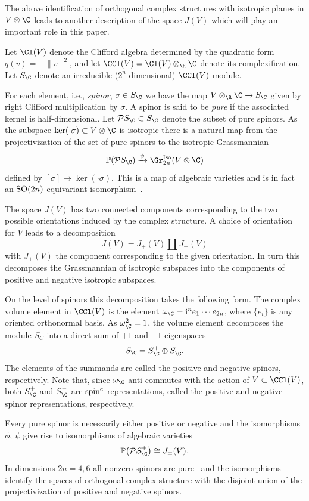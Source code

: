 The above identification of orthogonal complex structures with isotropic planes in
$V\otimes \C$ leads to another description of the space $J(V)$ which will play an
important role in this paper.


Let $\Cl(V)$ denote the Clifford algebra determined by the quadratic form $q(v)=-\|v\|^2$, and let $\CCl(V)=\Cl(V)\otimes_\R \C$
denote its complexification. Let $S_{\C}$ denote an irreducible ($2^n$-dimensional) $\CCl(V)$-module.

For each element, i.e., \emph{spinor}, $\sigma \in S_{\C}$ we have the map $V\otimes_\R \C \to S_{\C}$ given by right Clifford multiplication by $\sigma$. A spinor is said to be \emph{pure} if the associated kernel is half-dimensional. Let ${\mathcal P}S _{\C} \subset S_\C$ denote the subset of pure spinors. As the subspace $\ker (\cdot \sigma) \subset V\otimes \C$ is isotropic
there is a natural map from the projectivization of the set of pure spinors to the isotropic Grassmannian
\[
\mathbb{P}( {\mathcal P}S _\C ) \xrightarrow{\psi} \Gr^{\rm Iso}_{2n}(V\otimes \C)
\]
defined by $[\sigma] \mapsto \ker (\cdot \sigma)$. This is a map of algebraic varieties and is in fact an ${\rm SO}(2n)$-equivariant isomorphism~\cite[Proposition~IV.9.7]{LM}.

The space $J(V)$ has two connected components corresponding to the two possible orientations induced by the complex structure. A choice of orientation for $V$ leads to a decomposition
\[J(V) = J_+(V) \coprod J_-(V)\]
with $J_+(V)$ the component corresponding to the given orientation. In turn this decomposes the Grassmannian of isotropic subspaces into the components of positive and negative isotropic subspaces.

On the level of spinors this decomposition takes the following form.
The complex volume element in $\CCl(V)$ is the element
$\omega_\C = {\rm i}^n e_1 \cdots e_{2n}$, where
$\{e_i\}$ is any oriented orthonormal basis. As $\omega_{\C}^2=1$, the volume element decomposes
the module $S_C$ into a direct sum of $+1$ and $-1$ eigenspaces
\[
S_\C = S_\C^+ \oplus S_\C^-.
\]
The elements of the summands are called the positive and negative spinors, respectively.
Note that, since $\omega_\C$ anti-commutes with the action of $V \subset \CCl(V)$, both
$S_\C^+$ and $S_\C^-$ are ${\rm spin}^{\rm c}$ representations, called the positive and negative spinor representations, respectively.

Every pure spinor is necessarily either positive or negative and the isomorphisms $\phi$, $\psi$ give rise to isomorphisms of algebraic varieties
\[
\mathbb{P}\big({\mathcal P}S _\C^\pm\big) \cong J_\pm(V).
\]
In dimensions $2n=4,6$ all nonzero spinors are pure~\cite[Remark~IV.9.12]{LM} and the isomorphisms identify the spaces
of orthogonal complex structure with the disjoint union of the projectivization of positive
and negative spinors.

